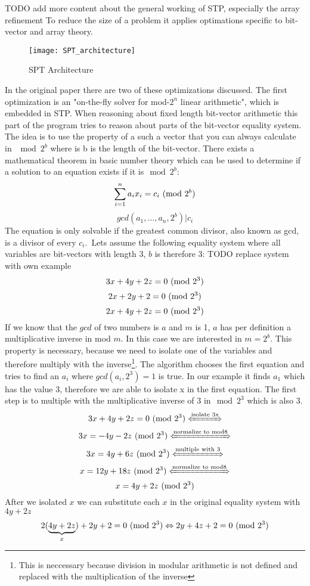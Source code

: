 TODO add more content about the general working of STP, especially the array refinement
To reduce the size of a problem it applies optimations specific to bit-vector and array theory.
\begin{figure}
\texttt{[image: SPT\_architecture]}
\centering
\caption{SPT Architecture}
\label{fig:spt_architecture}
\end{figure}
In the original paper\cite{Ganesh:2007:DPB:1770351.1770421} there are two of these optimizations discussed. The first optimization is an "on-the-fly solver for mod-$2^n$ linear arithmetic", which is embedded in STP. 
When reasoning about fixed length bit-vector arithmetic this part of the program tries to reason about parts of the bit-vector equality system.
The idea is to use the property of a such a vector that you can always calculate in $\mod{2^b}$ where is b is the length of the bit-vector.
There exists a mathematical theorem in basic number theory which can be used to determine if a solution to an equation exists if it is$\mod{2^b}$:
$$\sum_{i=1}^{n} a_ix_i = c_i  \ (\mathrm{mod}\ 2^b)$$
$$gcd(a_1,...,a_n,2^b) | c_i$$
The equation is only solvable if the greatest common divisor, also known as gcd, is a divisor of every $c_i$.\
Lets assume the following equality system where all variables are bit-vectors with length 3, $b$ is therefore 3:
TODO replace system with own example
$$3x+4y+2z=0 \ (\mathrm{mod}\ 2^3)$$
$$2x+2y+2=0  \ (\mathrm{mod}\ 2^3)$$
$$2x+4y+2z=0 \ (\mathrm{mod}\ 2^3)$$
If we know that the $gcd$ of two numbers is $a$ and $m$ is 1, $a$ has per definition a multiplicative inverse in mod $m$. In this case we are interested in $m=2^b$. This property is necessary, because we need to isolate one of the variables and therefore multiply with the inverse\footnote{This is neccessary because division in modular arithmetic is not defined and replaced with the multiplication of the inverse}.
The algorithm chooses the first equation and tries to find an $a_i$ where $gcd(a_i,2^3) = 1$ is true. In our example it finds $a_1$ which has the value $3$, therefore we are able to isolate x in the first equation.
The first step is to multiple with the multiplicative inverse of 3 in$\mod{2^3}$ which is also 3.
$$3x+4y+2z = 0 \Mod{2^3} \xleftrightarrow{\text{isolate 3x}}$$
$$3x=-4y-2z  \Mod{2^3}   \xleftrightarrow{\text{normalize to mod8}}$$
$$3x=4y+6z  \Mod{2^3}  \xleftrightarrow{\text{multiple with 3}}$$
$$x=12y+18z \Mod{2^3}  \xleftrightarrow{\text{normalize to mod8}}$$
$$x=4y+2z \ (\mathrm{mod}\ 2^3) $$
After we isolated $x$ we can substitute each $x$ in the original equality system with $4y+2z$
$$2(\underbrace{4y+2z}_{x})+2y+2=0 \ (\mathrm{mod}\ 2^3) \Leftrightarrow 2y + 4z + 2 = 0\ (\mathrm{mod}\ 2^3) $$

